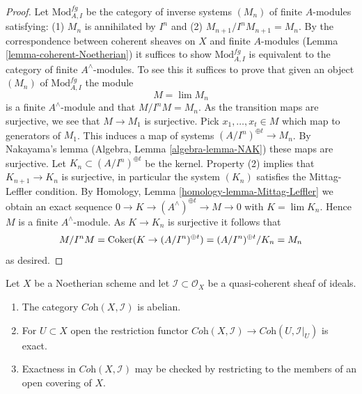\begin{proof}
Let $\text{Mod}^{fg}_{A, I}$ be the category of inverse systems $(M_n)$
of finite $A$-modules satisfying: (1) $M_n$ is annihilated by $I^n$ and (2)
$M_{n + 1}/I^nM_{n + 1} = M_n$. By the correspondence between coherent
sheaves on $X$ and finite $A$-modules (Lemma \ref{lemma-coherent-Noetherian})
it suffices to show $\text{Mod}^{fg}_{A, I}$ is equivalent to the category of
finite $A^\wedge$-modules. To see this it suffices to prove that given
an object $(M_n)$ of $\text{Mod}^{fg}_{A, I}$ the module
$$
M = \lim M_n
$$
is a finite $A^\wedge$-module and that $M/I^nM = M_n$. As the transition
maps are surjective, we see that $M \to M_1$ is surjective.
Pick $x_1, \ldots, x_t \in M$ which map to generators of $M_1$.
This induces a map of systems $(A/I^n)^{\oplus t} \to M_n$.
By Nakayama's lemma (Algebra, Lemma \ref{algebra-lemma-NAK}) these maps are
surjective. Let $K_n \subset (A/I^n)^{\oplus t}$ be the kernel.
Property (2) implies that $K_{n + 1} \to K_n$ is surjective, in particular
the system $(K_n)$ satisfies the Mittag-Leffler condition.
By Homology, Lemma \ref{homology-lemma-Mittag-Leffler}
we obtain an exact sequence
$0 \to K \to (A^\wedge)^{\oplus t} \to M \to 0$
with $K = \lim K_n$.
Hence $M$ is a finite $A^\wedge$-module.
As $K \to K_n$ is surjective it follows that
$$
M/I^nM = \mathop{\mathrm{Coker}}(K \to (A/I^n)^{\oplus t}) =
(A/I^n)^{\oplus t}/K_n = M_n
$$
as desired.
\end{proof}

\begin{lemma}
\label{lemma-inverse-systems-abelian}
Let $X$ be a Noetherian scheme and let $\mathcal{I} \subset \mathcal{O}_X$
be a quasi-coherent sheaf of ideals.
\begin{enumerate}
\item The category $\textit{Coh}(X, \mathcal{I})$ is abelian.
\item For $U \subset X$ open the restriction functor
$\textit{Coh}(X, \mathcal{I}) \to \textit{Coh}(U, \mathcal{I}|_U)$
is exact.
\item Exactness in $\textit{Coh}(X, \mathcal{I})$ may be checked by
restricting to the members of an open covering of $X$.
\end{enumerate}
\end{lemma}

